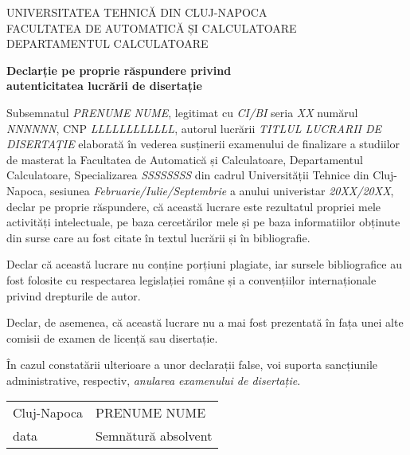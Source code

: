 \documentclass[12pt,a4paper,twoside]{report}
\begin{document}
\begin{titlepage}

\begin{center}
UNIVERSITATEA TEHNICĂ DIN CLUJ-NAPOCA\\
FACULTATEA DE AUTOMATICĂ ȘI CALCULATOARE\\
DEPARTAMENTUL CALCULATOARE\\
\end{center}

\vspace{4cm}

\begin{center}
\textbf{Declarție pe proprie răspundere privind \\ autenticitatea lucrării de disertație}

\end{center}

\vspace{1cm}

Subsemnatul \textit{PRENUME NUME}, legitimat cu \textit{CI/BI} seria \textit{XX} numărul \textit{NNNNNN}, CNP \textit{LLLLLLLLLLLL}, autorul lucrării \textit{TITLUL LUCRARII DE DISERTAȚIE} elaborată în vederea susținerii examenului de finalizare a studiilor de masterat la Facultatea de Automatică și Calculatoare, Departamentul Calculatoare, Specializarea \textit{SSSSSSSS} din cadrul Universității Tehnice din Cluj-Napoca, sesiunea \textit{Februarie/Iulie/Septembrie} a anului univeristar \textit{20XX/20XX}, declar pe proprie răspundere, că această lucrare este rezultatul propriei mele activități intelectuale, pe baza cercetărilor mele și pe baza informatiilor obținute din surse care au fost citate în textul lucrării și în bibliografie.

Declar că această lucrare nu conține porțiuni plagiate, iar sursele bibliografice au fost folosite cu respectarea legislației române și a convențiilor internaționale privind drepturile de autor.

Declar, de asemenea, că această lucrare  nu a mai fost prezentată în fața unei alte comisii de examen de licență sau disertație.

În cazul constatării ulterioare a unor declarații false, voi suporta sancțiunile administrative, respectiv, \textit{anularea examenului de disertație}.


\vspace{3cm}

%
\begin{tabularx}{\textwidth}{lR}
Cluj-Napoca & PRENUME NUME\\
data  &    Semnătură absolvent \\
\end{tabularx}


\end{titlepage}
\end{document}
